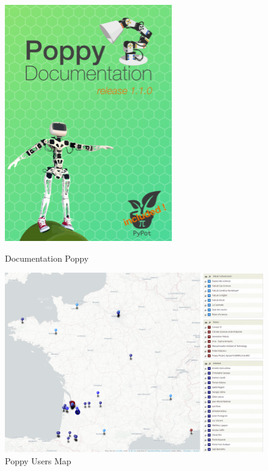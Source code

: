         \begin{figure}[!h]
        \begin{minipage}{0.45\linewidth}
            \centering
            \href{https://docs.poppy-project.org/}{\includegraphics[width=0.85\linewidth]{Figures/Poppy-doc}}
            \caption{Documentation Poppy}\label{fig:poppy_doc}
        \end{minipage}
        \hfill
        \begin{minipage}{0.545\linewidth}
            \centering
            \includegraphics[width=\linewidth]{Figures/poppy-umap.png}
            \caption{Poppy Users Map}\label{fig:poppy_map}
        \end{minipage}
        \end{figure}\par%

